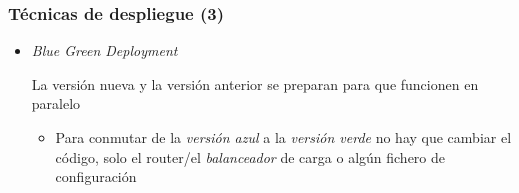 \documentclass[ucs]{beamer}
\begin{document}
\begin{frame}[fragile]
\frametitle{Técnicas de despliegue (3)}
\begin{itemize}
\item
\emph{Blue Green Deployment}

La versión nueva y la versión anterior se preparan para que funcionen
en paralelo 

\begin{itemize}
\item
Para conmutar de la
\emph{versión azul}
a la
\emph{versión verde}
no hay que cambiar el código, solo el router/el
\emph{balanceador} de carga o algún fichero de configuración
\end{itemize}
\end{itemize}
\end{frame}
\end{document}
